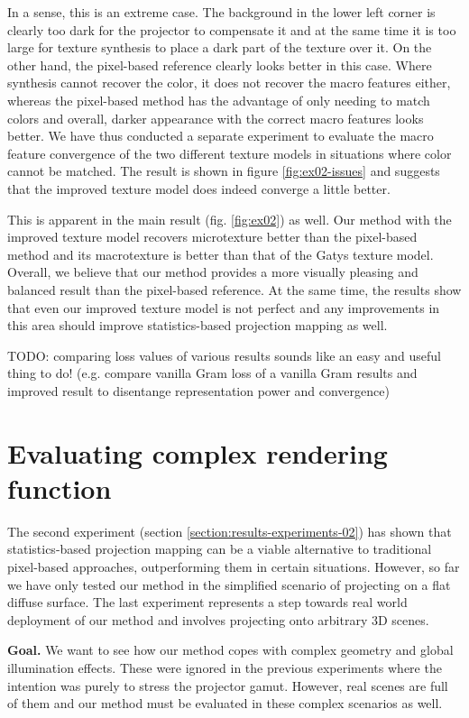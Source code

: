 In a sense, this is an extreme case. The background in the lower left corner is clearly too dark for the projector to compensate it and at the same time it is too large for texture synthesis to place a dark part of the texture over it. On the other hand, the pixel-based reference clearly looks better in this case. Where synthesis cannot recover the color, it does not recover the macro features either, whereas the pixel-based method has the advantage of only needing to match colors and overall, darker appearance with the correct macro features looks better. We have thus conducted a separate experiment to evaluate the macro feature convergence of the two different texture models in situations where color cannot be matched. The result is shown in figure \ref{fig:ex02-issues} and suggests that the improved texture model does indeed converge a little better.

This is apparent in the main result (fig. \ref{fig:ex02}) as well. Our method with the improved texture model recovers microtexture better than the pixel-based method and its macrotexture is better than that of the Gatys texture model. Overall, we believe that our method provides a more visually pleasing and balanced result than the pixel-based reference. At the same time, the results show that even our improved texture model is not perfect and any improvements in this area should improve statistics-based projection mapping as well.

{\color{red} TODO: comparing loss values of various results sounds like an easy and useful thing to do! (e.g. compare vanilla Gram loss of a vanilla Gram results and improved result to disentange representation power and convergence)}

\section{Evaluating complex rendering function}
\label{section:results-experiments-03}

The second experiment (section \ref{section:results-experiments-02}) has shown that statistics-based projection mapping can be a viable alternative to traditional pixel-based approaches, outperforming them in certain situations. However, so far we have only tested our method in the simplified scenario of projecting on a flat diffuse surface. The last experiment represents a step towards real world deployment of our method and involves projecting onto arbitrary 3D scenes.

\textbf{Goal.} We want to see how our method copes with complex geometry and global illumination effects. These were ignored in the previous experiments where the intention was purely to stress the projector gamut. However, real scenes are full of them and our method must be evaluated in these complex scenarios as well.

